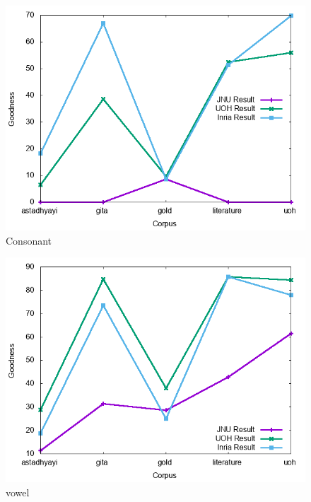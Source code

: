 \documentclass[11pt]{article}
\begin{document}
\begin{figure}[h]
	\center
	\includegraphics[scale=0.34]{images/consonant.png}
	\caption{\label{screen}Consonant}
\end{figure}

\begin{figure}[h]
	\center
	\includegraphics[scale=0.34]{images/vowel.png}
	\caption{\label{screen}vowel}
\end{figure}
\end{document}

